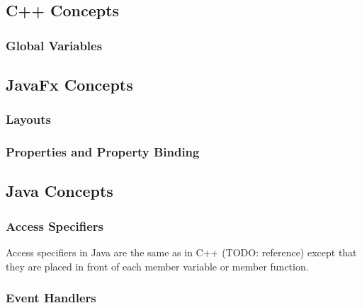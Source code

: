 \subsection{C++ Concepts}

\subsubsection{Global Variables} 

\subsection{JavaFx Concepts}

\subsubsection{Layouts}
\subsubsection{Properties and Property Binding}

\subsection {Java Concepts}

\subsubsection{Access Specifiers}

Access specifiers in Java are the same as in C++ (TODO: reference) except that they are placed in front of each member variable or member function.

\subsubsection {Event Handlers}